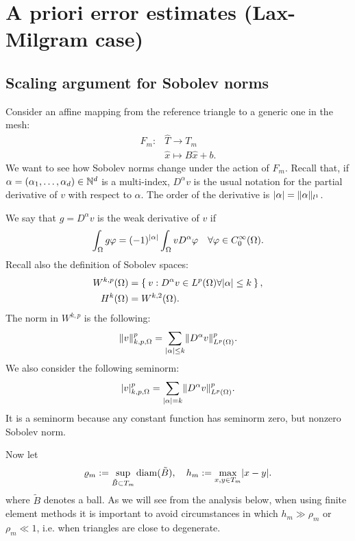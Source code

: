 
\chapter[A priori error estimates (Lax-Milgram case)]{A priori error estimates (Lax-Milgram case)}

\section{Scaling argument for Sobolev norms}


Consider an affine mapping from the reference triangle to a generic one in the mesh:
\begin{align}
F_m: &\hat{T} \to T_m \\
&\hat{x} \mapsto B \hat{x} + b.
\end{align}
We want to see how Sobolev norms change under the action of $F_m$. Recall that, if $\alpha = (\alpha_1, \dots, \alpha_d) \in \mathbb{N}^d$ is a multi-index, $D^\alpha v$ is the usual notation for the partial derivative of $v$ with respect to $\alpha$. The order of the derivative is $\lvert\alpha\rvert = \lVert\alpha\rVert_{l^1}$.

We say that $g = D^\alpha v$ is the weak derivative of $v$ if
\[
\int_\Omega g \varphi = (-1)^{\lvert\alpha\rvert} \int_\Omega v D^\alpha \varphi \quad \forall \varphi \in C^\infty_0(\Omega).
\]
Recall also the definition of Sobolev spaces:
\begin{align}
W^{k,p}(\Omega) &= \Set{v : D^\alpha v \in L^p(\Omega)  \forall \lvert\alpha\rvert \le k}, \\
H^k(\Omega) &= W^{k,2}(\Omega).
\end{align}
The norm in $W^{k,p}$ is the following:
\[
\lVert v\rVert^p_{k,p,\Omega} = \sum_{\lvert\alpha\rvert \le k} \lVert D^\alpha v\rVert^p_{L^p(\Omega)}.
\]
We also consider the following seminorm:
\[
\lvert v\rvert^p_{k,p,\Omega} = \sum_{\lvert\alpha\rvert = k} \lVert D^\alpha v\rVert^p_{L^p(\Omega)}.
\]
It is a seminorm because any constant function has seminorm zero, but nonzero Sobolev norm.

Now let
\[
\varrho_m := \sup_{\tilde{B} \subset T_m} \operatorname{diam}(\tilde{B}), \quad h_m := \max_{x,y \in T_m} \lvert x-y\rvert.
\]
where $\tilde{B}$ denotes a ball.
As we will see from the analysis below, when using finite element methods it is important to avoid circumstances in which $h_m \gg \rho_m$ or $\rho_m \ll 1$, i.e. when triangles are close to degenerate.

